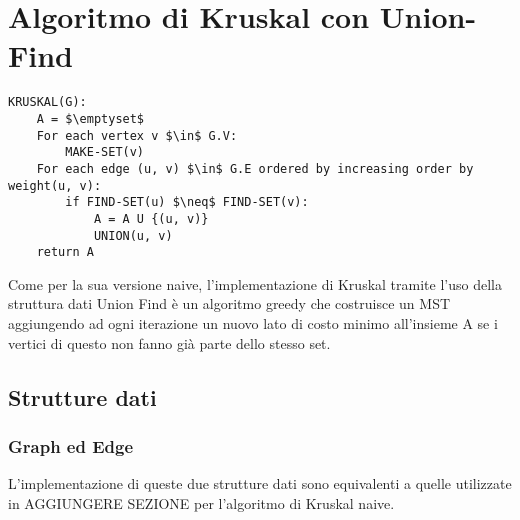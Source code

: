 \section{Algoritmo di Kruskal con Union-Find}

\begin{lstlisting}[mathescape=true]
KRUSKAL(G):
	A = $\emptyset$
	For each vertex v $\in$ G.V:
		MAKE-SET(v)
	For each edge (u, v) $\in$ G.E ordered by increasing order by weight(u, v):
		if FIND-SET(u) $\neq$ FIND-SET(v):       
			A = A U {(u, v)}
			UNION(u, v)
	return A
\end{lstlisting}

Come per la sua versione naive, l'implementazione di Kruskal tramite l'uso della struttura dati Union Find è un algoritmo greedy che costruisce un MST aggiungendo ad ogni iterazione un nuovo lato di costo minimo all'insieme A se i vertici di questo non fanno già parte dello stesso set.

\subsection{Strutture dati}

	\subsubsection{Graph ed Edge}
		L'implementazione di queste due strutture dati sono equivalenti a quelle utilizzate in AGGIUNGERE SEZIONE per l'algoritmo di Kruskal naive.
	
